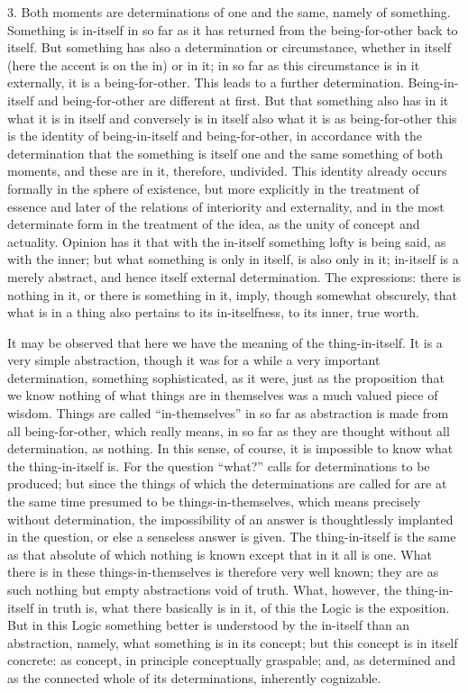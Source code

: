 3. Both moments are determinations of one and the same,
namely of something.
Something is in-itself in so far as it has returned
from the being-for-other back to itself.
But something has also a determination or circumstance,
whether in itself (here the accent is on the in) or in it;
in so far as this circumstance is in it externally,
it is a being-for-other.
This leads to a further determination.
Being-in-itself and being-for-other
are different at first.
But that something also has in it what it is in itself and
conversely is in itself also what it is as being-for-other
this is the identity of being-in-itself and being-for-other,
in accordance with the determination
that the something is itself
one and the same something of both moments,
and these are in it, therefore, undivided.
This identity already occurs formally in the sphere of existence,
but more explicitly in the treatment of essence
and later of the relations of interiority and externality,
and in the most determinate form in the treatment of the idea,
as the unity of concept and actuality.
Opinion has it that with the in-itself
something lofty is being said, as with the inner;
but what something is only in itself, is also only in it;
in-itself is a merely abstract,
and hence itself external determination.
The expressions:
there is nothing in it,
or there is something in it,
imply, though somewhat obscurely,
that what is in a thing also pertains
to its in-itselfness, to its inner, true worth.

It may be observed that here we have
the meaning of the thing-in-itself.
It is a very simple abstraction,
though it was for a while a very important determination,
something sophisticated, as it were,
just as the proposition that we know nothing of
what things are in themselves was a much valued piece of wisdom.
Things are called “in-themselves” in so far as abstraction
is made from all being-for-other, which really means,
in so far as they are thought without all determination, as nothing.
In this sense, of course, it is impossible to know
what the thing-in-itself is.
For the question “what?” calls for determinations to be produced;
but since the things of which the determinations are called for
are at the same time presumed to be things-in-themselves,
which means precisely without determination,
the impossibility of an answer is thoughtlessly implanted in the question,
or else a senseless answer is given.
The thing-in-itself is the same as that absolute
of which nothing is known except that in it all is one.
What there is in these things-in-themselves is therefore very well known;
they are as such nothing but empty abstractions void of truth.
What, however, the thing-in-itself in truth is,
what there basically is in it,
of this the Logic is the exposition.
But in this Logic something better is understood by the in-itself
than an abstraction, namely, what something is in its concept;
but this concept is in itself concrete:
as concept, in principle conceptually graspable;
and, as determined and as the connected whole
of its determinations, inherently cognizable.


